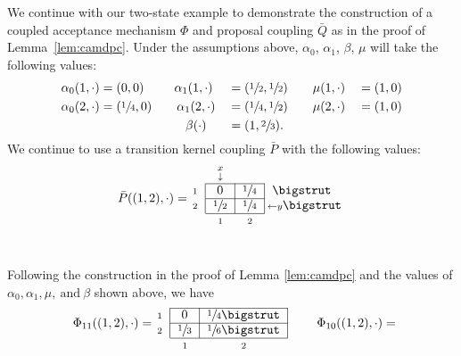 \documentclass[aihp]{imsart}
\theoremstyle{plain}
\theoremstyle{remark}
\theoremstyle{definition} \newtheorem{example}{Example}
\newcommand{\eq}[1]{\begin{align*}#1\end{align*}} %
\newcommand{\cd}{\cdot}
\newcommand{\sas}{\ \text{and} \ }
\newcommand{\bp}{\bar P}
\newcommand{\bq}{\bar Q}
\newcommand{\h}{\sfrac{1}{2}}
\begin{document}
\begin{appendix}
We continue with our two-state example to demonstrate the construction of a coupled acceptance
mechanism $\Phi$ and proposal coupling $\bq$ as in the proof of Lemma~\ref{lem:camdpc}. Under the
assumptions above, $\alpha_0$, $\alpha_1$, $\beta$, $\mu$ will take the following values:
\begin{alignat*}{3}
	\alpha_0(1,\cd) & = (0,0) \qquad
	\hspace{1ex} \alpha_1(1,\cd) && = (\h,\h) \qquad
	\mu(1,\cd) && = (1,0) \\
	\alpha_0(2,\cd) & = (\sfrac{1}{4},0) \qquad
	\alpha_1(2,\cd) && = (\sfrac{1}{4},\h) \qquad
	\mu(2,\cd) &&= (1,0) \\
	& \hspace{16ex} \beta(\cd) && = (1, \sfrac{2}{3}).
\end{alignat*}
We continue to use a transition kernel coupling $\bp$ with the following values:
\eq{
	\raisebox{3pt}{ $ \bp((1,2), \cd) = $ } \hspace{-5pt}
	\begin{blockarray}{rccl}
		& {\stackrel{x}{\scriptstyle \downarrow}} & &  \\
		\begin{block}{ r |c|c| l }
			\cline{2-3}
			{\scriptstyle 1}  & 0 & \sfrac{1}{4} & \bigstrut \\
			\cline{2-3}
			{\scriptstyle 2} &\h & \sfrac{1}{4} & {\hspace{-4pt} \scriptstyle \leftarrow y} \bigstrut  \\
			\cline{2-3}
		\end{block}
		\  & {\scriptstyle 1} & {\scriptstyle 2}
	\end{blockarray}
}\\[-1.5em]
Following the construction in the proof of Lemma \ref{lem:camdpc} and the values of $\alpha_0,
\alpha_1, \mu, \sas \beta$ shown above, we have
\eq{
	\raisebox{10pt}{ $ \Phi_{11}((1,2), \cd) = $ } \hspace{-5pt}
	\begin{blockarray}{rcc}
		\begin{block}{ r |c|c|}
			\cline{2-3}
			{\scriptstyle 1}  & 0 & \sfrac{1}{4}  \bigstrut  \\
			\cline{2-3}
			{\scriptstyle 2} &\sfrac{1}{3} & \sfrac{1}{6} \bigstrut  \\
			\cline{2-3}
		\end{block}
		\  & {\scriptstyle 1} & {\scriptstyle 2}
	\end{blockarray}
	\qquad
	\raisebox{10pt}{ $ \Phi_{10}((1,2), \cd) = $ } \hspace{-5pt}
}
\end{appendix}
\end{document}
